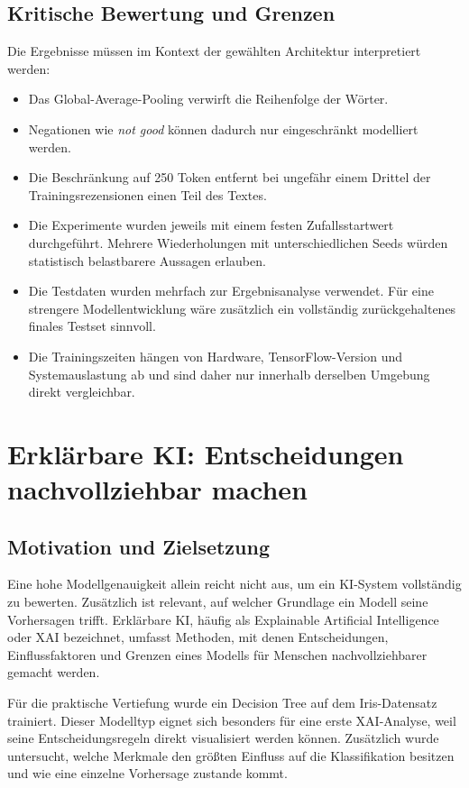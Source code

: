 \documentclass[12pt,a4paper]{article}
\begin{document}
\subsection{Kritische Bewertung und Grenzen}

Die Ergebnisse müssen im Kontext der gewählten Architektur interpretiert werden:

\begin{itemize}
    \item Das Global-Average-Pooling verwirft die Reihenfolge der Wörter.
    \item Negationen wie \emph{not good} können dadurch nur eingeschränkt modelliert werden.
    \item Die Beschränkung auf 250 Token entfernt bei ungefähr einem Drittel der Trainingsrezensionen einen Teil des Textes.
    \item Die Experimente wurden jeweils mit einem festen Zufallsstartwert durchgeführt. Mehrere Wiederholungen mit unterschiedlichen Seeds würden statistisch belastbarere Aussagen erlauben.
    \item Die Testdaten wurden mehrfach zur Ergebnisanalyse verwendet. Für eine strengere Modellentwicklung wäre zusätzlich ein vollständig zurückgehaltenes finales Testset sinnvoll.
    \item Die Trainingszeiten hängen von Hardware, TensorFlow-Version und Systemauslastung ab und sind daher nur innerhalb derselben Umgebung direkt vergleichbar.
\end{itemize}



\section{Erklärbare KI: Entscheidungen nachvollziehbar machen}

\subsection{Motivation und Zielsetzung}

Eine hohe Modellgenauigkeit allein reicht nicht aus, um ein
KI-System vollständig zu bewerten. Zusätzlich ist relevant, auf
welcher Grundlage ein Modell seine Vorhersagen trifft. Erklärbare
KI, häufig als Explainable Artificial Intelligence oder XAI
bezeichnet, umfasst Methoden, mit denen Entscheidungen,
Einflussfaktoren und Grenzen eines Modells für Menschen
nachvollziehbarer gemacht werden.

Für die praktische Vertiefung wurde ein Decision Tree auf dem
Iris-Datensatz trainiert. Dieser Modelltyp eignet sich besonders für
eine erste XAI-Analyse, weil seine Entscheidungsregeln direkt
visualisiert werden können. Zusätzlich wurde untersucht, welche
Merkmale den größten Einfluss auf die Klassifikation besitzen und
wie eine einzelne Vorhersage zustande kommt.
\end{document}
